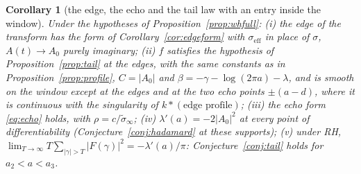 \documentclass[11pt]{article}
\newtheorem{corollary}[theorem]{Corollary}
\theoremstyle{definition}
\theoremstyle{remark}
\begin{document}
\begin{corollary}[the edge, the echo and the tail law with an entry inside the window]\label{cor:full}
Under the hypotheses of Proposition~\ref{prop:whfull}: (i) the edge of the transform has the form of Corollary~\ref{cor:edgeform} with $\sigma_{\mathrm{eff}}$ in place of $\sigma$, $A(t)\to A_0$ purely imaginary; (ii) $f$ satisfies the hypothesis of Proposition~\ref{prop:tail} at the edges, with the same constants as in Proposition~\ref{prop:profile}, $C=|A_0|$ and $\beta=-\gamma-\log(2\pi a)-\lambda$, and is smooth on the window except at the edges and at the two echo points $\pm(a-d)$, where it is continuous with the singularity of $k*(\text{edge profile})$; (iii) the echo form \eqref{eq:echo} holds, with $\rho=c/\tilde\sigma_\infty$; (iv) $\lambda'(a)=-2|A_0|^2$ at every point of differentiability (Conjecture~\ref{conj:hadamard} at these supports); (v) under RH, $\lim_{T\to\infty}T\sum_{|\gamma|>T}|F(\gamma)|^2=-\lambda'(a)/\pi$: Conjecture~\ref{conj:tail} holds for $a_2<a<a_3$.
\end{corollary}
\end{document}
